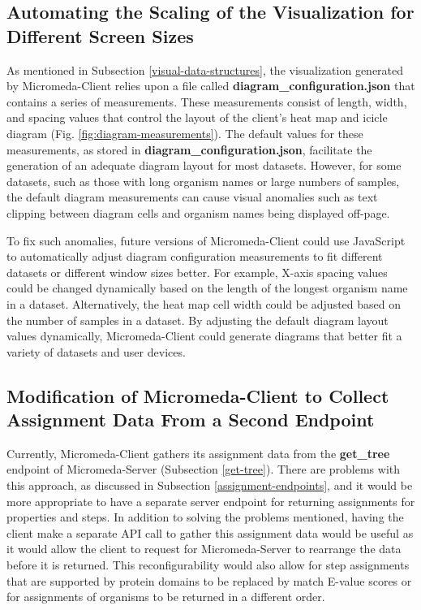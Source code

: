 \subsection{Automating the Scaling of the Visualization for Different Screen Sizes}

As mentioned in Subsection \ref{visual-data-structures}, the visualization generated by Micromeda-Client relies upon a file called \textbf{diagram\_configuration.json} that contains a series of measurements. These measurements consist of length, width, and spacing values that control the layout of the client's heat map and icicle diagram (Fig. \ref{fig:diagram-measurements}). The default values for these measurements, as stored in \textbf{diagram\_configuration.json}, facilitate the generation of an adequate diagram layout for most datasets. However, for some datasets, such as those with long organism names or large numbers of samples, the default diagram measurements can cause visual anomalies such as text clipping between diagram cells and organism names being displayed off-page.

To fix such anomalies, future versions of Micromeda-Client could use JavaScript to automatically adjust diagram configuration measurements to fit different datasets or different window sizes better. For example, X-axis spacing values could be changed dynamically based on the length of the longest organism name in a dataset. Alternatively, the heat map cell width could be adjusted based on the number of samples in a dataset. By adjusting the default diagram layout values dynamically, Micromeda-Client could generate diagrams that better fit a variety of datasets and user devices.

\subsection{Modification of Micromeda-Client to Collect Assignment Data From a Second Endpoint}

Currently, Micromeda-Client gathers its assignment data from the \textbf{get\_tree} endpoint of Micromeda-Server (Subsection \ref{get-tree}). There are problems with this approach, as discussed in Subsection \ref{assignment-endpoints}, and it would be more appropriate to have a separate server endpoint for returning assignments for properties and steps. In addition to solving the problems mentioned, having the client make a separate API call to gather this assignment data would be useful as it would allow the client to request for Micromeda-Server to rearrange the data before it is returned. This reconfigurability would also allow for step assignments that are supported by protein domains to be replaced by match E-value scores or for assignments of organisms to be returned in a different order. 

